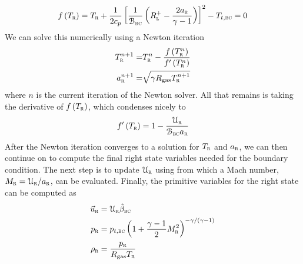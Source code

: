 %
\begin{equation}
  f\left(T_{\textsc{r}}\right) = T_{\textsc{r}} + \frac{1}{2c_p}
    \left[ 
      \frac{1}{\mathcal{B}_{\textsc{bc}}}
      \left( R^+_{\textsc{l}} - \frac{2a_{\textsc{r}}}{\gamma-1} \right)
    \right]^2 - T_{t,\textsc{bc}}
  = 0
  \label{EQ:BC:Inflow:Subsonic1:fTr}
\end{equation}
%
We can solve this numerically using a Newton iteration
%
\begin{align*}
  T^{n+1}_{\textsc{r}} =&
         T^n_{\textsc{r}} - \frac{f\left(T^n_{\textsc{r}}\right)}{f'\left(T^n_{\textsc{r}}\right)}
  \\
  a^{n+1}_{\textsc{r}} =& \sqrt{ \gamma R_{\textrm{gas}} T^{n+1}_{\textsc{r}} }
\end{align*}
%
where $n$ is the current iteration of the Newton solver.
%
All that remains is taking the derivative of $f\left(T_{\textsc{r}}\right)$, which
condenses nicely to
%
\begin{equation*}
  f'\left(T_{\textsc{r}}\right) = 1 - \frac{\mathcal{U}_{\textsc{r}}}{\mathcal{B}_{\textsc{bc}} a_{\textsc{r}}}
\end{equation*}
%
After the Newton iteration converges to a solution for $T_{\textsc{r}}$ and
$a_{\textsc{r}}$,
we can then continue on to compute the final right state variables needed
for the boundary condition.
%
The next step is to update $\mathcal{U}_{\textsc{r}}$ using
 from which a Mach number,
$M_{\textsc{r}}=\mathcal{U}_{\textsc{r}} / a_{\textsc{r}}$, can be evaluated.
%
Finally, the primitive variables for the right state can be computed as
%
\begin{alignat}{1}
  \vec{u}_{\textsc{r}} & = \mathcal{U}_{\textsc{r}} \hat{\beta}_{\textsc{bc}}
  \label{EQ:BC:Inflow:Subsonic1:velR}
  \\
        p_{\textsc{r}} & = p_{t,\textsc{bc}}
                    \left( 1 + \frac{\gamma-1}{2} M^2_{\textsc{r}}
                    \right)^{-\gamma / \left( \gamma - 1 \right)}
  \label{EQ:BC:Inflow:Subsonic1:presR}
  \\
     \rho_{\textsc{r}} & = \frac{p_{\textsc{r}}}{R_{\textrm{gas}} T_{\textsc{r}}}
  \label{EQ:BC:Inflow:Subsonic1:densR}
\end{alignat}


\label{SEC:BC:Inflow:Subsonic:2}

